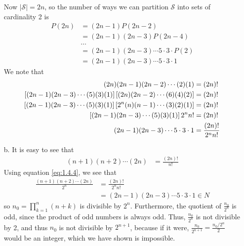 \documentclass[12 pt]{amsart}
\begin{document}
\begin{enumerate}
      Now $|\mathscr{S}| = 2n$, so the number of ways we can partition
      $\mathscr{S}$ into sets of cardinality 2 is 
      \begin{align*}
        P(2n) &= (2n-1) P(2n-2) \\
              &= (2n-1)(2n-3)P(2n-4) \\
              &\ldots  \\
              &= (2n-1)(2n-3)\cdots 5 \cdot 3 \cdot  P(2) \\
              &= (2n-1)(2n-3)\cdots 5 \cdot 3 \cdot 1
      \end{align*}
      We note that 
      \begin{align}
          (2n)(2n-1)(2n-2) \cdots (2)(1) &= (2n)! \notag \\
          \left[
            (2n-1)(2n-3)\cdots (5)(3)(1)
          \right]
          \left[
            (2n)(2n-2) \cdots (6)(4)(2)
          \right]
          &= (2n)! \notag \\
          \left[
            (2n-1)(2n-3)\cdots (5)(3)(1)
          \right]
          \left[
            2^n (n)(n-1) \cdots (3)(2)(1)
          \right] 
          &= (2n)! \notag \\
          \left[
            (2n-1)(2n-3)\cdots (5)(3)(1)
          \right]
            2^n n!
          &= (2n)! \notag \\
            \label{eq:1.4.4}
          (2n-1)(2n-3)\cdots 5 \cdot 3 \cdot 1
          &= 
          \frac{(2n)!}{2^n n!}
      \end{align}
      \vfill
      \clearpage
      \phantom{\quad}
      \vfill
		\item[b.]
      It is easy to see that 
      \begin{align*}
        (n+1)(n+2) \cdots (2n) &= \frac{(2n)!}{n!}
      \end{align*}
      Using equation \ref{eq:1.4.4}, we see that 
      \begin{align*}
        \frac{(n+1)(n+2) \cdots (2n)}{2^n} 
          &= \frac{(2n)!}{2^n n!} \\
          &= (2n-1)(2n-3)\cdots 5 \cdot 3 \cdot 1 \in {N}
      \end{align*}
      so $n_0 = \prod_{k=1}^{n} (n + k)$ is divisible by $2^n$.
      Furthermore, the quotient of $\frac{n_0}{2^n}$ is odd, since
      the product of odd numbers is always odd. 
      Thus, $\frac{n_0}{2^n}$ is not divisible by 2, and thus
      $n_0$ is not divisible by $2^{n+1}$, because if it were, 
      $\frac{n_0}{2^{n+1}} = \frac{n_0 \big/ 2^n}{2}$ would be 
      an integer, which we have shown is impossible.
	\end{enumerate}
\vfill
\newpage
\end{document}
